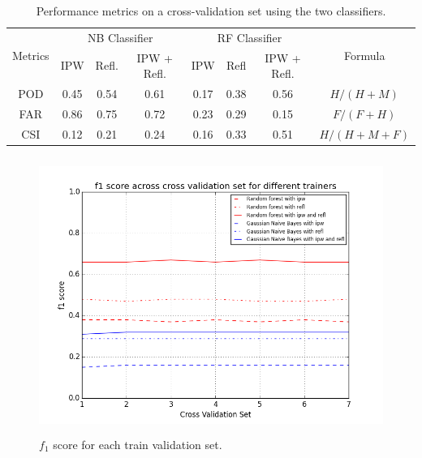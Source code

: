 \documentclass[proposal]{umassthesis}
\begin{document}
\begin{table}[!h]
\centering
\caption{Performance metrics on a cross-validation set using the two classifiers.}
\label{performance_metrics}
\begin{tabular}{cccccccc}
\hline
\hline
\multicolumn{1}{l}{\multirow{2}{*}{Metrics}} & \multicolumn{3}{c}{NB Classifier} & \multicolumn{3}{c}{RF Classifier} & \multirow{2}{*}{Formula}            \\ \cline{2-7}
\multicolumn{1}{l}{}                         & IPW     & Refl.   & IPW + Refl.   & IPW     & Refl    & IPW + Refl.   &                                     \\ \hline
POD                                          & 0.45    & 0.54    & 0.61          & 0.17    & 0.38    & 0.56          & $H / (H + M)$                       \\
FAR                                          & 0.86    & 0.75    & 0.72          & 0.23    & 0.29    & 0.15          & $F/(F + H)$                         \\
CSI                                          & 0.12    & 0.21    & 0.24          & 0.16    & 0.33    & 0.51          & \multicolumn{1}{l}{$H/(H + M + F)$} \\ \hline
\end{tabular}
\end{table}

\begin{figure}[!t]
\begin{center}
\includegraphics[width = 15cm,height = 9cm]{f1_scores}
\caption{$f_1$ score for each train validation set.}\label{fig:f1_scores}
\end{center}
\end{figure}
\end{document}
